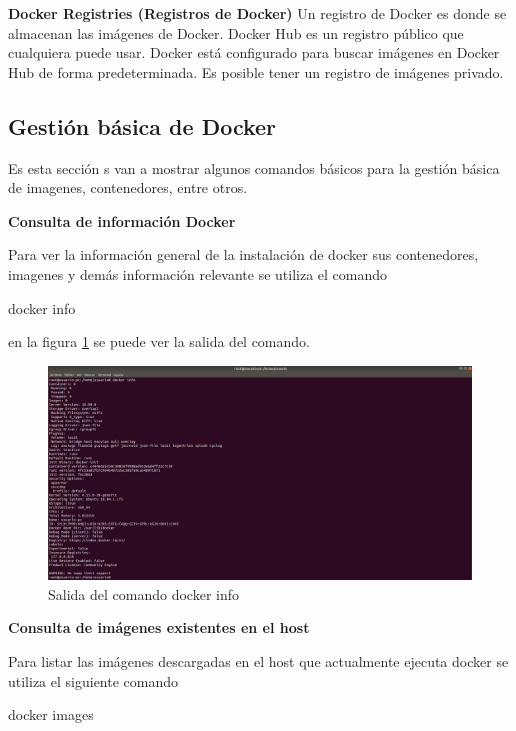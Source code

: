 \textbf{Docker Registries (Registros de Docker)}
Un registro de Docker es donde se almacenan las imágenes de Docker. Docker Hub es un registro público que cualquiera puede usar. Docker está configurado para buscar imágenes en Docker Hub de forma predeterminada. Es posible tener un registro de imágenes privado. \parencite{Docker2018}



\subsection{Gestión básica de Docker}

Es esta sección s van a mostrar algunos comandos básicos para la gestión básica de imagenes, contenedores, entre otros.

\textbf{Consulta de información Docker}

Para ver la información general de la instalación de docker sus contenedores, imagenes y demás información relevante se utiliza el comando \begin{commandshell}docker info\end{commandshell} 
en la figura \ref{fig:DockerGestion1} se puede ver la salida del comando.

\begin{figure}[!hbtp]
	\centering
	\includegraphics[width=\linewidth]{RE05_Docker/Gestion_basica/REDocker_Gestion1.png}
	\vspace{-0.2cm}
	\caption{Salida del comando docker info}
	\label{fig:DockerGestion1}
\end{figure}
\textbf{Consulta de imágenes existentes en el host}

Para listar las imágenes descargadas en el host que actualmente ejecuta docker se utiliza el siguiente comando  \begin{commandshell}docker images\end{commandshell}

